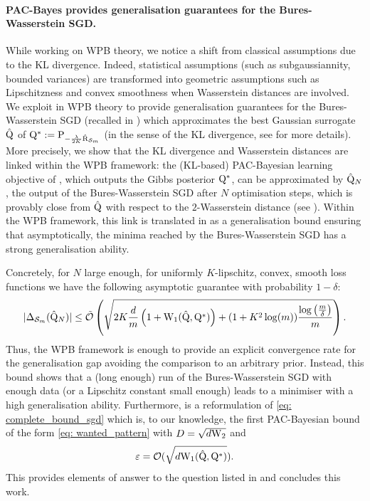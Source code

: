 \paragraph{PAC-Bayes provides generalisation guarantees for the Bures-Wasserstein SGD.}
While working on WPB theory, we notice a shift from classical assumptions due to the KL divergence. Indeed, statistical assumptions (such as subgaussiannity, bounded variances) are transformed into geometric assumptions such as Lipschitzness and convex smoothness when Wasserstein distances are involved. We exploit in  WPB theory to provide generalisation guarantees for the Bures-Wasserstein SGD (recalled in ) which approximates the best Gaussian surrogate $\hat{\mathrm{Q}}$ of $\mathrm{Q}^*:= \mathrm{P}_{-\frac{\lambda}{2K}\hat{\text{R}}_{\mathcal{S}_m}}$ (in the sense of the KL divergence, see  for more details).
More precisely, we show that the KL divergence and Wasserstein distances are linked within the WPB framework: the (KL-based) PAC-Bayesian learning objective of \citet{catoni2007pac}, which outputs the Gibbs posterior $\mathrm{Q}^*$, can be approximated by $\hat{\mathrm{Q}}_N$, the output of the Bures-Wasserstein SGD after $N$ optimisation steps, which is provably close from $\hat{\mathrm{Q}}$ with respect to the $2$-Wasserstein distance (see ).
Within the WPB framework, this link is translated in  as a generalisation bound ensuring that asymptotically, the minima reached by the Bures-Wasserstein SGD has a strong generalisation ability.
\medskip

Concretely, for $N$ large enough, for uniformly $K$-lipschitz, convex, smooth loss functions we have the following asymptotic guarantee with probability $1-\delta$:
\begin{align*}
|\Delta_{\mathcal{S}_m}(\hat{\mathrm{Q}}_N)|  \leq\Tilde{\mathcal{O}}\left( \sqrt{2K\frac{d}{m}\left(1 + \mathrm{W}_{1}(\hat{\mathrm{Q}},\mathrm{Q}^*)\right)+ (1+K^2\log(m)) \frac{\log\left( \frac{m}{\delta} \right)}{m}} \right).
\end{align*}
Thus, the WPB framework is enough to provide an explicit convergence rate for the generalisation gap avoiding the comparison to an arbitrary prior. Instead, this bound shows that a (long enough) run of the Bures-Wasserstein SGD with enough data (or a Lipschitz constant small enough) leads to a minimiser with a high generalisation ability. Furthermore,  is a reformulation of \eqref{eq: complete_bound_sgd} which is, to our knowledge, the first PAC-Bayesian bound of the form \eqref{eq: wanted_pattern} with $D=\sqrt{d \mathrm{W}_{2}}$ and $$\varepsilon= \mathcal{O}(\sqrt{d\mathrm{W}_{1}(\hat{\mathrm{Q}},\mathrm{Q}^*)}).$$
This provides elements of answer to the question listed in  and concludes this work.

